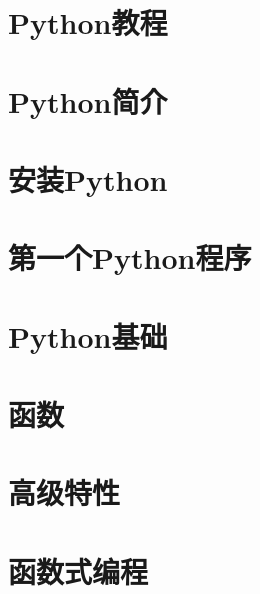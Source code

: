 \section*{Python教程}


\newpage
\section{Python简介}



\newpage
\section{安装Python}

\newpage



\newpage
\section{第一个Python程序}

\newpage

\newpage

\newpage



\newpage
\section{Python基础}

\newpage

\newpage

\newpage

\newpage

\newpage

\newpage



\newpage
\section{函数}

\newpage

\newpage

\newpage

\newpage



\newpage
\section{高级特性}

\newpage

\newpage

\newpage

\newpage

\newpage



\newpage
\section{函数式编程}

\newpage

\newpage

\newpage

\newpage

\newpage

\newpage

\newpage

\newpage




